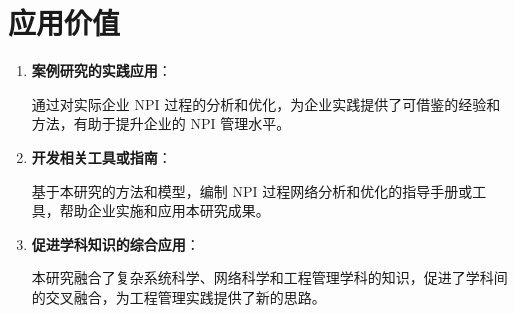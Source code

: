 \section{应用价值}

\begin{enumerate}
  \item \textbf{案例研究的实践应用}：

  通过对实际企业 NPI 过程的分析和优化，为企业实践提供了可借鉴的经验和方法，有助于提升企业的 NPI 管理水平。

  \item \textbf{开发相关工具或指南}：

  基于本研究的方法和模型，编制 NPI 过程网络分析和优化的指导手册或工具，帮助企业实施和应用本研究成果。

  \item \textbf{促进学科知识的综合应用}：

  本研究融合了复杂系统科学、网络科学和工程管理学科的知识，促进了学科间的交叉融合，为工程管理实践提供了新的思路。

\end{enumerate}